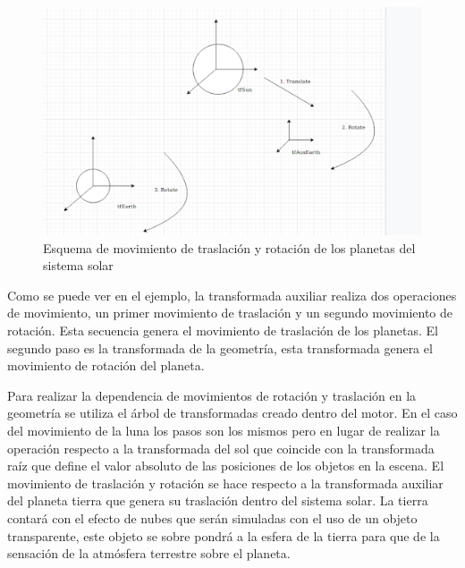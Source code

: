 \documentclass[a4paper, 17pt]{book}
\begin{document}
\begin{figure}[H]
    \centering
    \includegraphics[scale=0.50, keepaspectratio]{img/SolarMove.png}
    \caption{Esquema de movimiento de traslación y rotación de los planetas del sistema solar}
    \label{figura:SolarMove}
\end{figure}

Como se puede ver en el ejemplo, la transformada auxiliar realiza dos operaciones de movimiento, un primer movimiento
de traslación y un segundo movimiento de rotación. Esta secuencia genera el movimiento de traslación de los planetas.
El segundo paso es la transformada de la geometría, esta transformada genera el movimiento de rotación del planeta.

\vspace{1mm} %

Para realizar la dependencia de movimientos de rotación y traslación en la geometría se utiliza el árbol de transformadas
creado dentro del motor. En el caso del movimiento de la luna los pasos son los mismos pero en lugar de realizar la operación
respecto a la transformada del sol que coincide con la transformada raíz que define el valor absoluto de las posiciones de los
objetos en la escena. El movimiento de traslación y rotación se hace respecto a la transformada auxiliar del planeta tierra
que genera su traslación dentro del sistema solar. La tierra contará con el efecto de nubes que serán simuladas con el uso
de un objeto transparente, este objeto se sobre pondrá a la esfera de la tierra para que de la sensación de la atmósfera
terrestre sobre el planeta.
\end{document}
